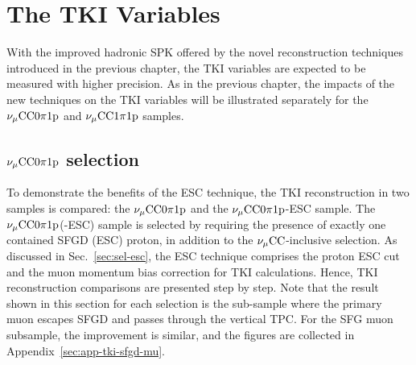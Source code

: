 \section{The TKI Variables}
\label{sec:mc-tki}
     With the improved hadronic SPK offered by the novel reconstruction techniques introduced in the previous chapter, the TKI variables are expected to be measured with higher precision. As in the previous chapter, the impacts of the new techniques on the TKI variables will be illustrated separately for the $\nu_{\mu}\textrm{CC}0\pi1\textrm{p}$ and $\nu_{\mu}\textrm{CC}1\pi1\textrm{p}$ samples.

     \subsection{$\nu_{\mu}\textrm{CC}0\pi1\textrm{p}$ selection}
     \label{sec:mc-tki-0pi}
          To demonstrate the benefits of the ESC technique, the TKI reconstruction in two samples is compared: the $\nu_{\mu}\textrm{CC}0\pi1\textrm{p}$ and the $\nu_{\mu}\textrm{CC}0\pi1\textrm{p}$-ESC sample.
          The $\nu_{\mu}\textrm{CC}0\pi1\textrm{p}$(-ESC) sample is selected by requiring the presence of exactly one contained SFGD (ESC) proton, in addition to the $\nu_{\mu}\textrm{CC}$-inclusive selection.
          As discussed in Sec.~\ref{sec:sel-esc}, the ESC technique comprises the proton ESC cut and the muon momentum bias correction for TKI calculations.
          Hence, TKI reconstruction comparisons are presented step by step.
          Note that the result shown in this section for each selection is the sub-sample where the primary muon escapes SFGD and passes through the vertical TPC. 
          For the SFG muon subsample, the improvement is similar, and the figures are collected in Appendix~\ref{sec:app-tki-sfgd-mu}.

